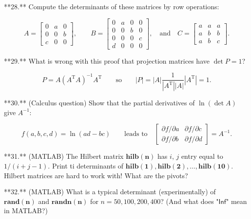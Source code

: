 **28.** Compute the determinants of these matrices by row operations:

\[A=\left[\begin{matrix}0&a&0\\ 0&0&b\\ c&0&0\end{matrix}\right],\qquad B=\left[\begin{matrix}0&a&0&0\\ 0&0&b&0\\ 0&0&0&c\\ d&0&0&0\end{matrix}\right],\quad\text{and}\quad C=\left[\begin{matrix}a&a&a \\ a&b&b\\ a&b&c\end{matrix}\right].\]

**29.** What is wrong with this proof that projection matrices have \(\det P=1\)?

\[P=A(A^{\text{T}}A)^{-1}A^{\text{T}}\qquad\text{so}\qquad|P|=|A|\frac{1}{|A^{ \text{T}}||A|}|A^{\text{T}}|=1.\]

**30.** (Calculus question) Show that the partial derivatives of \(\ln(\det A)\) give \(A^{-1}\):

\[f(a,b,c,d)=\ln(ad-bc)\qquad\text{leads to}\quad\left[\begin{matrix}\partial f /\partial a&\partial f/\partial c\\ \partial f/\partial b&\partial f/\partial d\end{matrix}\right]=A^{-1}.\]

**31.** (MATLAB) The Hilbert matrix \(\mathbf{hilb(n)}\) has \(i\), \(j\) entry equal to \(1/(i+j-1)\). Print ti determinants of \(\mathbf{hilb(1),hilb(2),\ldots,hilb(10)}\). Hilbert matrices are hard to work with! What are the pivots?

**32.** (MATLAB) What is a typical determinant (experimentally) of \(\mathbf{rand(n)}\) and \(\mathbf{randn(n)}\) for \(n=50,100,200,400\)? (And what does "\(\mathsf{Inf}\)" mean in MATLAB?)